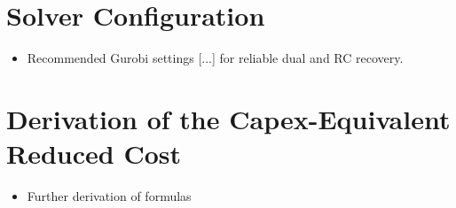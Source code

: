 \section{Solver Configuration}
\label{app:solver-config}
\begin{itemize}
	\item Recommended Gurobi settings [...] for reliable dual and \ac{RC} recovery.
\end{itemize}

\section{Derivation of the Capex-Equivalent Reduced Cost}
\label{app:rc-derivation}
\begin{itemize}
	\item Further derivation of formulas 
\end{itemize}
